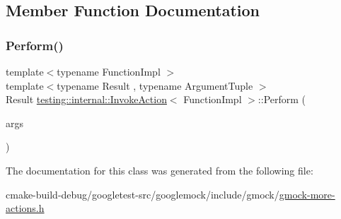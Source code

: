 \subsection{Member Function Documentation}
\mbox{\label{classtesting_1_1internal_1_1InvokeAction_af357ce691795b3520de1fda4ab8af8b2}} 
\subsubsection{\texorpdfstring{Perform()}{Perform()}}
{\footnotesize\ttfamily template$<$typename Function\+Impl $>$ \\
template$<$typename Result , typename Argument\+Tuple $>$ \\
Result \mbox{\hyperlink{classtesting_1_1internal_1_1InvokeAction}{testing\+::internal\+::\+Invoke\+Action}}$<$ Function\+Impl $>$\+::Perform (\begin{DoxyParamCaption}\item[{const Argument\+Tuple \&}]{args }\end{DoxyParamCaption})\hspace{0.3cm}{\ttfamily [inline]}}



The documentation for this class was generated from the following file\+:\begin{DoxyCompactItemize}
\item 
cmake-\/build-\/debug/googletest-\/src/googlemock/include/gmock/\mbox{\hyperlink{gmock-more-actions_8h}{gmock-\/more-\/actions.\+h}}\end{DoxyCompactItemize}
